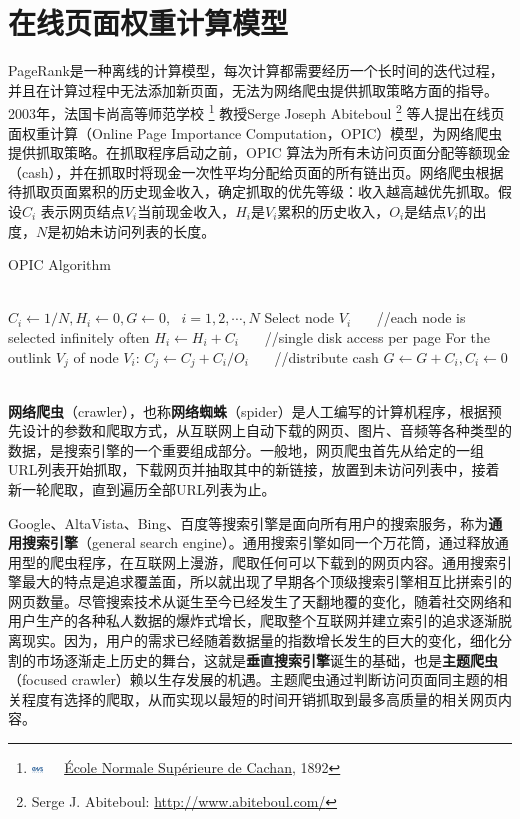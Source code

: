 \section{在线页面权重计算模型}
PageRank是一种离线的计算模型，每次计算都需要经历一个长时间的迭代过程，并且在计算过程中无法添加新页面，无法为网络爬虫提供抓取策略方面的指导。2003年，法国卡尚高等师范学校
\footnote{\includegraphics[width=3.0mm]{figures/university/ENS-Cachan.eps}~~~\href{http://www.ens-cachan.fr/}{\'{E}cole Normale Sup\'{e}rieure de Cachan}, 1892}
教授Serge Joseph Abiteboul
\footnote{Serge J. Abiteboul: \href{http://www.abiteboul.com/}{http://www.abiteboul.com/}}
等人\cite{abiteboul2003adaptive}提出在线页面权重计算（Online Page Importance Computation，OPIC）模型，为网络爬虫提供抓取策略。在抓取程序启动之前，OPIC 算法为所有未访问页面分配等额现金（cash），并在抓取时将现金一次性平均分配给页面的所有链出页。网络爬虫根据待抓取页面累积的历史现金收入，确定抓取的优先等级：收入越高越优先抓取。假设$C_i$ 表示网页结点$V_i$当前现金收入，$H_i$是$V_i$累积的历史收入，$O_i$是结点$V_i$的出度，$N$是初始未访问列表的长度。
\begin{algorithm}[htbp]
\caption{OPIC Algorithm}
\begin{algorithmic}[1]
\REQUIRE ~~\\
$C_i \leftarrow 1/N, H_i \leftarrow 0, G \leftarrow 0, ~~~ i = 1, 2, \cdots, N$
\STATE Select node $V_i$ ~~~//each node is selected infinitely often
\STATE $H_i \leftarrow H_i + C_i$ ~~~//single disk access per page
\STATE For the outlink $V_j$ of node $V_i$: $C_j \leftarrow C_j + C_i/O_i$ ~~~//distribute cash
\STATE $G \leftarrow G + C_i, C_i\leftarrow 0$
\ENDFOR
\ENSURE ~~\\
\end{algorithmic}
\end{algorithm}

\begin{shaded}
\textbf{网络爬虫}（crawler），也称\textbf{网络蜘蛛}（spider）是人工编写的计算机程序，根据预先设计的参数和爬取方式，从互联网上自动下载的网页、图片、音频等各种类型的数据，是搜索引擎的一个重要组成部分。一般地，网页爬虫首先从给定的一组URL列表开始抓取，下载网页并抽取其中的新链接，放置到未访问列表中，接着新一轮爬取，直到遍历全部URL列表为止。

Google、AltaVista、Bing、百度等搜索引擎是面向所有用户的搜索服务，称为\textbf{通用搜索引擎}（general search engine）。通用搜索引擎如同一个万花筒，通过释放通用型的爬虫程序，在互联网上漫游，爬取任何可以下载到的网页内容。通用搜索引擎最大的特点是追求覆盖面，所以就出现了早期各个顶级搜索引擎相互比拼索引的网页数量。尽管搜索技术从诞生至今已经发生了天翻地覆的变化，随着社交网络和用户生产的各种私人数据的爆炸式增长，爬取整个互联网并建立索引的追求逐渐脱离现实。因为，用户的需求已经随着数据量的指数增长发生的巨大的变化，细化分割的市场逐渐走上历史的舞台，这就是\textbf{垂直搜索引擎}诞生的基础，也是\textbf{主题爬虫}（focused crawler）赖以生存发展的机遇。主题爬虫通过判断访问页面同主题的相关程度有选择的爬取，从而实现以最短的时间开销抓取到最多高质量的相关网页内容。
\end{shaded}

